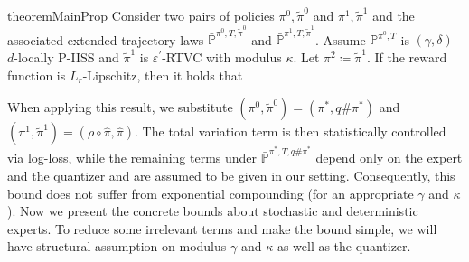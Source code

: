 \documentclass{article}
\newcommand{\arxiv}[1]{\iftoggle{icml}{}{#1}}
\newcommand{\icml}[1]{\iftoggle{icml}{#1}{}}
\begin{document}
\begin{restatable}{theorem}{MainProp}\label{prop:main_result}
Consider two pairs of policies $\pi^0,\tilde \pi^0$ and $\pi^1,\tilde \pi^1$ and the associated extended trajectory laws $\bar {\mathbb P}^{\pi^0, T,\tilde \pi^0}$ and $\bar {\mathbb P}^{\pi^1, T,\tilde \pi^1}$. Assume $\mathbb P^{\pi^0, T}$ is $(\gamma,\delta)$-$d$-locally P-IISS and $\tilde \pi^1$ is $\varepsilon^\prime$-RTVC with modulus $\kappa$. Let $\pi^2\coloneqq \tilde \pi^1$. If the reward function is $L_r$-Lipschitz, then it holds that
\icml{
\begin{align*}
&\bigl|J(\pi^0)-J(\pi^2)\bigr|
\lesssim H^2\delta +H\cdot\textnormal{TV}(\bar{\mathbb P}^{\pi^0,T,\tilde \pi^0},\bar {\mathbb P}^{\pi^1,T,\tilde \pi^1})\\&+H\cdot \bar{\mathbb P}^{\pi^0, T, \tilde \pi^0}\left(\exists h\in [H], \|\tilde u_h-u_h^0\|>d-\varepsilon^\prime\right)\\&
 + H\cdot\mathbb{E}_{\bar{\mathbb{P}}^{\pi^0,T,\tilde \pi^0}}\left\{
   \sum_{h=1}^{H}
   \Big[
     \kappa\big(
       \gamma\big( (\|u_k^0-\tilde{u}_k^0\|+\varepsilon' \big)_{k=1}^{h-1})
     \big)
\right.\\&\left.
     + 
     \frac{1}{H}L_r\Big(
         \gamma\big((\|u_k^0-\tilde{u}_k^0\| + \varepsilon')_{k=1}^{h-1} \big)
         + \|u_h^0-\tilde{u}_h^0\|+\varepsilon^\prime
       \Big)
   \Big]
 \right\}.
\end{align*}
}
\arxiv{
\begin{align*}
\bigl|J(\pi^0)&-J(\pi^2)\bigr|
\lesssim H^2\delta +H\cdot\textnormal{TV}(\bar{\mathbb P}^{\pi^0,T,\tilde \pi^0},\bar {\mathbb P}^{\pi^1,T,\tilde \pi^1})+H\cdot \bar{\mathbb P}^{\pi^0, T, \tilde \pi^0}\left(\exists h\in [H], \|\tilde u_h-u_h^0\|>d-\varepsilon^\prime\right)\\&
 + H\cdot\mathbb{E}_{\bar{\mathbb{P}}^{\pi^0,T,\tilde \pi^0}}\left\{
   \sum_{h=1}^{H}
   \Big[
     \kappa\big(
       \gamma\big( (\|u_k^0-\tilde{u}_k^0\|+\varepsilon' \big)_{k=1}^{h-1})
     \big)
\right.\left.
     + 
     \frac{1}{H}L_r\Big(
         \gamma\big((\|u_k^0-\tilde{u}_k^0\| + \varepsilon')_{k=1}^{h-1} \big)
         + \|u_h^0-\tilde{u}_h^0\|+\varepsilon^\prime
       \Big)
   \Big]
 \right\}.
\end{align*}
}
\end{restatable}
When applying this result, we substitute $(\pi^0,\tilde\pi^0)=(\pi^*,q\#\pi^*)$ and $(\pi^1,\tilde\pi^1)=(\rho\circ\hat\pi,\hat\pi)$. The total variation term is then statistically controlled via log-loss, while the remaining terms under $\bar{\mathbb P}^{\pi^*,T,q\#\pi^*}$ depend only on the expert and the quantizer and are assumed to be given in our setting. Consequently, this bound does not suffer from exponential compounding (for an appropriate $\gamma$ and $\kappa$).  Now we present the concrete bounds about stochastic and deterministic experts. To reduce some irrelevant terms and make the bound simple, we will have structural assumption on modulus $\gamma$ and $\kappa$ as well as the quantizer.
\end{document}
